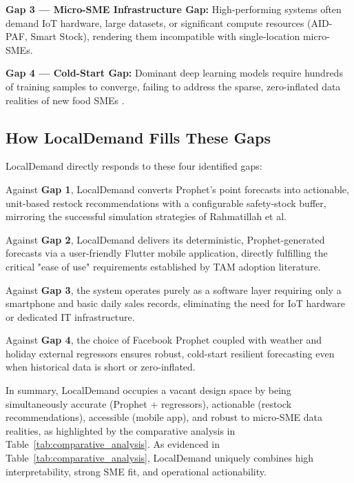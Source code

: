 \documentclass[conference]{IEEEtran}
\begin{document}
\textbf{Gap 3 --- Micro-SME Infrastructure Gap:} High-performing systems 
often demand IoT hardware, large datasets, or significant compute resources 
(AID-PAF, Smart Stock), rendering them incompatible with single-location 
micro-SMEs.

\textbf{Gap 4 --- Cold-Start Gap:} Dominant deep learning models require 
hundreds of training samples to converge, failing to address the sparse, 
zero-inflated data realities of new food SMEs \cite{susanto2026}.

\subsection{How LocalDemand Fills These Gaps}

LocalDemand directly responds to these four identified gaps:

Against \textbf{Gap 1}, LocalDemand converts Prophet's point forecasts into 
actionable, unit-based restock recommendations with a configurable safety-stock 
buffer, mirroring the successful simulation strategies of Rahmatillah et al.

Against \textbf{Gap 2}, LocalDemand delivers its deterministic, Prophet-generated 
forecasts via a user-friendly Flutter mobile application, directly fulfilling 
the critical "ease of use" requirements established by TAM adoption literature.

Against \textbf{Gap 3}, the system operates purely as a software layer requiring 
only a smartphone and basic daily sales records, eliminating the need for IoT 
hardware or dedicated IT infrastructure.

Against \textbf{Gap 4}, the choice of Facebook Prophet coupled with weather and 
holiday external regressors ensures robust, cold-start resilient forecasting 
even when historical data is short or zero-inflated.

In summary, LocalDemand occupies a vacant design space by being simultaneously 
accurate (Prophet + regressors), actionable (restock recommendations), accessible 
(mobile app), and robust to micro-SME data realities, as highlighted by the 
comparative analysis in Table~\ref{tab:comparative_analysis}. As evidenced in Table~\ref{tab:comparative_analysis}, LocalDemand uniquely combines high interpretability, strong SME fit, and operational actionability.
\end{document}
